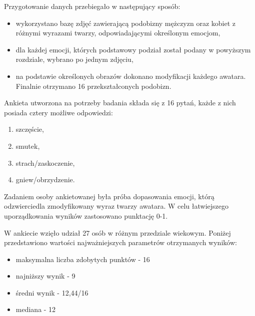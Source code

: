 Przygotowanie danych przebiegało w następujący sposób:
\begin{itemize}
    \item wykorzystano bazę zdjęć zawierającą podobizny mężczyzn oraz kobiet z różnymi wyrazami twarzy, odpowiadającymi określonym emocjom,
    \item dla każdej emocji, których podstawowy podział został podany w powyższym rozdziale, wybrano po jednym zdjęciu,
    \item na podstawie określonych obrazów dokonano modyfikacji każdego awatara. Finalnie otrzymano 16 przekształconych podobizn.
\end{itemize}

\newpage
Ankieta utworzona na potrzeby badania składa się z  16 pytań, każde z nich posiada cztery możliwe odpowiedzi:

\begin{enumerate}
    \item szczęście,
    \item smutek,
    \item strach/zaskoczenie,
    \item gniew/obrzydzenie.
\end{enumerate}

Zadaniem osoby ankietowanej była próba dopasowania emocji, którą odzwierciedla zmodyfikowany wyraz twarzy awatara. W celu łatwiejszego uporządkowania wyników zastosowano punktację 0-1. 

W ankiecie wzięło udział 27 osób w różnym przedziale wiekowym. Poniżej przedstawiono wartości najważniejszych parametrów otrzymanych wyników:
\begin{itemize}
    \item maksymalna liczba zdobytych punktów - 16
    \item najniższy wynik - 9
    \item średni wynik - 12,44/16
    \item mediana - 12
\end{itemize}

